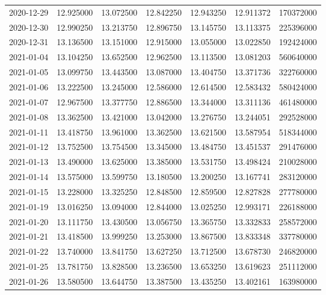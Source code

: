 \begin{tabular}{lrrrrrr}
2020-12-29 &   12.925000 &   13.072500 &   12.842250 &   12.943250 &   12.911372 &   170372000 \\
2020-12-30 &   12.990250 &   13.213750 &   12.896750 &   13.145750 &   13.113375 &   225396000 \\
2020-12-31 &   13.136500 &   13.151000 &   12.915000 &   13.055000 &   13.022850 &   192424000 \\
2021-01-04 &   13.104250 &   13.652500 &   12.962500 &   13.113500 &   13.081203 &   560640000 \\
2021-01-05 &   13.099750 &   13.443500 &   13.087000 &   13.404750 &   13.371736 &   322760000 \\
2021-01-06 &   13.222500 &   13.245000 &   12.586000 &   12.614500 &   12.583432 &   580424000 \\
2021-01-07 &   12.967500 &   13.377750 &   12.886500 &   13.344000 &   13.311136 &   461480000 \\
2021-01-08 &   13.362500 &   13.421000 &   13.042000 &   13.276750 &   13.244051 &   292528000 \\
2021-01-11 &   13.418750 &   13.961000 &   13.362500 &   13.621500 &   13.587954 &   518344000 \\
2021-01-12 &   13.752500 &   13.754500 &   13.345000 &   13.484750 &   13.451537 &   291476000 \\
2021-01-13 &   13.490000 &   13.625000 &   13.385000 &   13.531750 &   13.498424 &   210028000 \\
2021-01-14 &   13.575000 &   13.599750 &   13.180500 &   13.200250 &   13.167741 &   283120000 \\
2021-01-15 &   13.228000 &   13.325250 &   12.848500 &   12.859500 &   12.827828 &   277780000 \\
2021-01-19 &   13.016250 &   13.094000 &   12.844000 &   13.025250 &   12.993171 &   226188000 \\
2021-01-20 &   13.111750 &   13.430500 &   13.056750 &   13.365750 &   13.332833 &   258572000 \\
2021-01-21 &   13.418500 &   13.999250 &   13.253000 &   13.867500 &   13.833348 &   337780000 \\
2021-01-22 &   13.740000 &   13.841750 &   13.627250 &   13.712500 &   13.678730 &   246820000 \\
2021-01-25 &   13.781750 &   13.828500 &   13.236500 &   13.653250 &   13.619623 &   251112000 \\
2021-01-26 &   13.580500 &   13.644750 &   13.387500 &   13.435250 &   13.402161 &   163980000 \\

\end{tabular}
